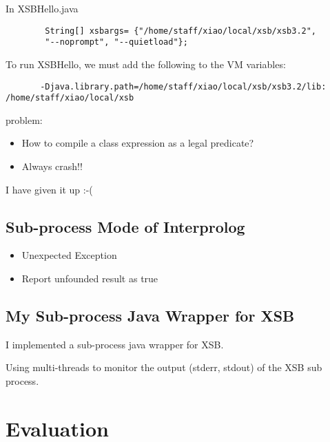 \documentclass{article}
\begin{document}
In XSBHello.java
\begin{verbatim}
    	String[] xsbargs= {"/home/staff/xiao/local/xsb/xsb3.2", 
    	"--noprompt", "--quietload"};
\end{verbatim}
	
To run XSBHello, we must add the following to the VM variables:
\begin{verbatim}
       -Djava.library.path=/home/staff/xiao/local/xsb/xsb3.2/lib:
/home/staff/xiao/local/xsb
\end{verbatim}
	
problem: 
\begin{itemize}
\item How to compile a class expression as a legal predicate?
\item Always crash!!
\end{itemize}

I have given it up :-(


\subsection{Sub-process Mode of Interprolog}

\begin{itemize}
\item Unexpected Exception
\item Report unfounded result as true
\end{itemize}

\subsection{My Sub-process Java Wrapper for XSB}

I implemented a sub-process java wrapper for XSB.

Using multi-threads to monitor the output (stderr, stdout) of the XSB
sub process.

\section{Evaluation}
\end{document}
